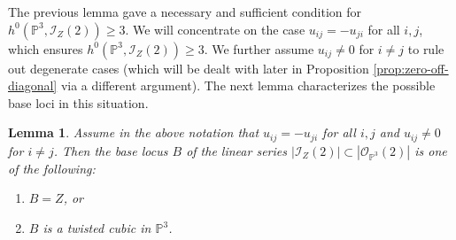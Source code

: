 \documentclass[a4paper,11pt]{amsart}
\numberwithin{equation}{section}
\newtheorem{lemma}[theorem]{Lemma}
\theoremstyle{definition}
\theoremstyle{remark}
\newcommand{\PP}{\mathbb P}
\newcommand{\CP}{\PP}
\begin{document}
The previous lemma gave a necessary and sufficient condition for $h^0(\CP^3,\mathcal I_Z(2))\geq 3$.
We will concentrate on the case $u_{ij}=-u_{ji}$ for all $i,j$, which ensures $h^0(\CP^3,\mathcal I_Z(2))\geq 3$.
We further assume $u_{ij}\neq 0$ for $i\neq j$ to rule out degenerate cases (which will be dealt with later in Proposition \ref{prop:zero-off-diagonal} via a different argument).
The next lemma characterizes the possible base loci in this situation.

\begin{lemma} \label{lem:base-locus}
Assume in the above notation that $u_{ij}=-u_{ji}$ for all $i,j$ and $u_{ij}\neq 0$ for $i\neq j$.
Then the base locus $B$ of the linear series $|\mathcal I_Z(2)|\subset |\mathcal O_{\CP^3}(2)|$ is one of the following:
\begin{enumerate}
    \item $B=Z$, or
    \item $B$ is a twisted cubic in $\CP^3$.
\end{enumerate}
\end{lemma}
\end{document}
